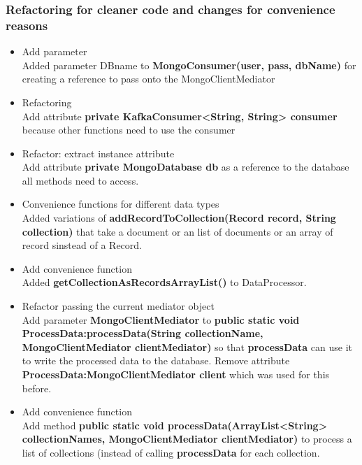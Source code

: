 \documentclass[oneside, english, final]{design}
\begin{document}
\subsubsection{Refactoring for cleaner code and changes for convenience reasons}
\begin{itemize}
\item{Add parameter
  \\
	Added parameter DBname to \textsf{\textbf{MongoConsumer(user, pass, dbName)}} for creating a reference to pass onto the MongoClientMediator}

\item{Refactoring
  \\
  Add attribute \textsf{\textbf{private KafkaConsumer<String, String> consumer}} because other functions need to use the consumer}

  \item{Refactor: extract instance attribute}
    \\ 
    Add attribute \textsf{\textbf{private MongoDatabase db}}
    as a reference to the database all methods need to access.

  \item{Convenience functions for different data types}
    \\
    Added variations of \textsf{\textbf{addRecordToCollection(Record record, String collection)}}
    that take a document or an list of documents or an array of record sinstead of a Record.


  \item{Add convenience function}
    \\
    Added \textsf{\textbf{getCollectionAsRecordsArrayList()}}
    to DataProcessor.

  \item{Refactor passing the current mediator object}
  \\
    Add parameter \textsf{\textbf{MongoClientMediator}} to \textsf{\textbf{public static void ProcessData:processData(String collectionName, MongoClientMediator clientMediator)}} so that \textsf{\textbf{processData}} can use it to write the processed data to the database. Remove attribute \textsf{\textbf{ProcessData:MongoClientMediator client}} which was used for this before.


  \item{Add convenience function}
    \\
    Add method \textsf{\textbf{public static void processData(ArrayList<String> collectionNames, MongoClientMediator clientMediator)}} to process a list of collections (instead of calling \textsf{\textbf{processData}} for each collection.
    

\end{itemize}
\end{document}
